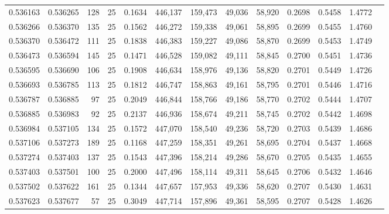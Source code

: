 \begin{tabular}{rrrrrrrrrrrrr}
0.536163 & 0.536265 &   128 &  25 &                                     0.1634 & 446,137 & 159,473 &  49,036 &  58,920 & 0.2698 & 0.5458 & 1.4772 \\
0.536266 & 0.536370 &   135 &  25 &                                     0.1562 & 446,272 & 159,338 &  49,061 &  58,895 & 0.2699 & 0.5455 & 1.4760 \\
0.536370 & 0.536472 &   111 &  25 &                                     0.1838 & 446,383 & 159,227 &  49,086 &  58,870 & 0.2699 & 0.5453 & 1.4749 \\
0.536473 & 0.536594 &   145 &  25 &                                     0.1471 & 446,528 & 159,082 &  49,111 &  58,845 & 0.2700 & 0.5451 & 1.4736 \\
0.536595 & 0.536690 &   106 &  25 &                                     0.1908 & 446,634 & 158,976 &  49,136 &  58,820 & 0.2701 & 0.5449 & 1.4726 \\
0.536693 & 0.536785 &   113 &  25 &                                     0.1812 & 446,747 & 158,863 &  49,161 &  58,795 & 0.2701 & 0.5446 & 1.4716 \\
0.536787 & 0.536885 &    97 &  25 &                                     0.2049 & 446,844 & 158,766 &  49,186 &  58,770 & 0.2702 & 0.5444 & 1.4707 \\
0.536885 & 0.536983 &    92 &  25 &                                     0.2137 & 446,936 & 158,674 &  49,211 &  58,745 & 0.2702 & 0.5442 & 1.4698 \\
0.536984 & 0.537105 &   134 &  25 &                                     0.1572 & 447,070 & 158,540 &  49,236 &  58,720 & 0.2703 & 0.5439 & 1.4686 \\
0.537106 & 0.537273 &   189 &  25 &                                     0.1168 & 447,259 & 158,351 &  49,261 &  58,695 & 0.2704 & 0.5437 & 1.4668 \\
0.537274 & 0.537403 &   137 &  25 &                                     0.1543 & 447,396 & 158,214 &  49,286 &  58,670 & 0.2705 & 0.5435 & 1.4655 \\
0.537403 & 0.537501 &   100 &  25 &                                     0.2000 & 447,496 & 158,114 &  49,311 &  58,645 & 0.2706 & 0.5432 & 1.4646 \\
0.537502 & 0.537622 &   161 &  25 &                                     0.1344 & 447,657 & 157,953 &  49,336 &  58,620 & 0.2707 & 0.5430 & 1.4631 \\
0.537623 & 0.537677 &    57 &  25 &                                     0.3049 & 447,714 & 157,896 &  49,361 &  58,595 & 0.2707 & 0.5428 & 1.4626 \\

\end{tabular}
